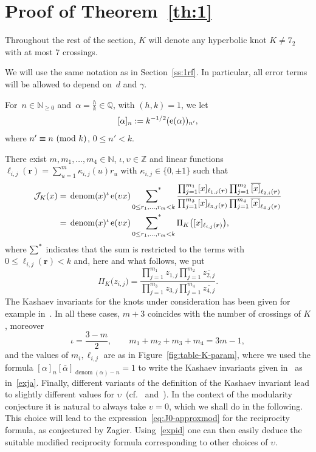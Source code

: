\documentclass[11pt]{amsart}
\newcommand{\Q}{\mathbb{Q}}
\newcommand{\N}{\mathbb{N}}
\newcommand{\Z}{\mathbb{Z}}
\newcommand{\J}{\mathcal{J}}
\renewcommand{\mod}[1]{~\pr{\textnormal{mod}~#1}}
\theoremstyle{definition}
\def\sumstar{\operatornamewithlimits{\sum\nolimits^*}}
\newcommand{\pr}[1]{\mathchoice{\left( #1\right)}{(#1)}{(#1)}{(#1)}}
\newcommand{\e}[1][]{\ifthenelse{\equal{#1}{}}{{\rm e}}{\operatorname{e}\pr{ #1}}}
\DeclareMathOperator{\denom}{denom}
\newcommand{\bs}{\boldsymbol }
\newcommand{\1}{{\mathbf 1}}
\let\originalleft\left
\let\originalright\right
\renewcommand{\left}{\mathopen{}\mathclose\bgroup\originalleft}
\renewcommand{\right}{\aftergroup\egroup\originalright}
\numberwithin{equation}{section}
\begin{document}
\section{Proof of Theorem~\ref{th:1}}\label{pmt1}

Throughout the rest of the section,  $K$ will denote any hyperbolic knot $K\neq 7_2$ with at most $7$ crossings. 

We will use the same notation as in Section~\ref{ss:1rf}. In particular, all error terms will be allowed to depend on~$d$ and $\gamma$.


For~$n\in\N_{\geq 0}$ and~$\alpha=\frac hk\in\Q$, with $(h,k)=1$, we let
\begin{align}\label{sb}
  [\alpha]_n :=k^{-1/2}  (\e[\alpha])_{n'}, 
\end{align}
where $n'\equiv n\mod {k}$, $0\leq n'<k$.

There exist $m,m_1,\dots,m_4\in\N$, $\iota,\upsilon\in\Z$ and linear functions  $\ell_{i,j}(\boldsymbol r)=\sum_{u=1}^m\kappa_{i,j}(u)r_u$ with $\kappa_{i,j}\in\{0,\pm1\}$ such that 
\begin{align}
  \J_{K}( x) ={}& \denom(x)^{\iota}\e[\upsilon x] \sumstar_{0\leq r_1,\dots, r_m<k}\frac{\prod_{j=1}^{m_1}[ x]_{\ell_{1,j}(\boldsymbol r)}\prod_{j=1}^{m_2}\overline{[ x]}_{\ell_{2,i}(\boldsymbol r)}}{\prod_{j=1}^{m_3}[ x]_{\ell_{3,j}(\boldsymbol r)}\prod_{j=1}^{m_4}\overline{[ x]}_{\ell_{4,j}(\boldsymbol r)}} \label{exja} \\
  = {}& \denom(x)^{\iota}\e[\upsilon x]  \sumstar_{0\leq r_1,\dots, r_m<k} \Pi_K\big([x]_{\ell_{i,j}(\boldsymbol r)}\big), \notag
\end{align}
where $\sumstar$ indicates that the sum is restricted to the terms with $0\leq \ell_{i,j}(\bs r)<k$ and, here and what follows, we put
$$ \Pi_K\big(z_{i, j}\big) = \frac{\prod_{j=1}^{m_1} z_{1,j} \prod_{j=1}^{m_2} \overline{z_{2,j}}}{\prod_{j=1}^{m_3} z_{3,j} \prod_{j=1}^{m_4} \overline{z_{4,j}}}. $$
The Kashaev invariants for the knots under consideration has been given for example  in~\cite{Ohtsuki52,OhtsukiYokota6,Ohtsuki7}. In all these cases, $m+3$ coincides with the number of crossings of $K$, moreover
$$ \iota=\frac{3-m}2, \qquad m_1+m_2+m_3+m_4 = 3m-1, $$
and the values of $m_i,\ell_{i,j}$ are as in Figure~\ref{fig:table-K-param}, where we used the formula $ [\alpha]_n [\overline{\alpha}]_{\denom({\alpha})-n}=1$ to write the Kashaev invariants given in~\cite{Ohtsuki52,OhtsukiYokota6,Ohtsuki7} as in~\eqref{exja}. Finally, different variants of the definition of the Kashaev invariant lead to slightly different values for $\upsilon$~(cf.~\cite[p.677 footnote 4]{Ohtsuki52} and~\cite{Yokota2003}). 
In the context of the modularity conjecture it is natural to always take $\upsilon=0$, which we shall do in the following. This choice will lead to the expression~\eqref{eq:J0-approxmod} for the reciprocity formula, as conjectured by Zagier. Using~\eqref{expid} one can then easily deduce the suitable modified reciprocity formula corresponding to other choices of $\upsilon$.
\end{document}
